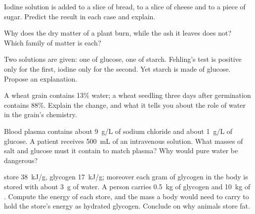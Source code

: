 \begin{exercise}[$\star\star$]\label{exo:g10:chemistry-of-life:9}
Iodine solution is added to a slice of bread, to a slice of cheese and
to a piece of sugar. Predict the result in each case and explain.
\end{exercise}

\begin{exercise}[$\star\star$]\label{exo:g10:chemistry-of-life:10}
Why does the dry matter of a plant burn, while the ash it leaves does
not? Which family of matter is each?
\end{exercise}

\begin{exercise}[$\star\star$]\label{exo:g10:chemistry-of-life:11}
Two solutions are given: one of glucose, one of starch. Fehling's test
is positive only for the first, iodine only for the second. Yet starch
is made of glucose. Propose an explanation.
\end{exercise}

\begin{exercise}[$\star\star\star$]\label{exo:g10:chemistry-of-life:12}
A wheat grain contains 13\% water; a wheat seedling three days after
germination contains 88\%. Explain the change, and what it tells you
about the role of water in the grain's chemistry.
\end{exercise}

\begin{exercise}[$\star\star\star$]\label{exo:g10:chemistry-of-life:13}
Blood plasma contains about \qty{9}{g/L} of sodium chloride and about
\qty{1}{g/L} of glucose. A patient receives \qty{500}{mL} of an
intravenous solution. What masses of salt and glucose must it contain
to match plasma? Why would pure water be dangerous?
\end{exercise}

\begin{exercise}[$\star\star\star$]\label{exo:g10:chemistry-of-life:14}
 store \qty{38}{kJ/g}, glycogen \qty{17}{kJ/g}; moreover each
gram of glycogen in the body is stored with about \qty{3}{g} of water.
A person carries \qty{0.5}{kg} of glycogen and \qty{10}{kg} of .
Compute the energy of each store, and the mass a body would need to
carry to hold the  store's energy as hydrated glycogen. Conclude
on why animals store fat.
\end{exercise}

